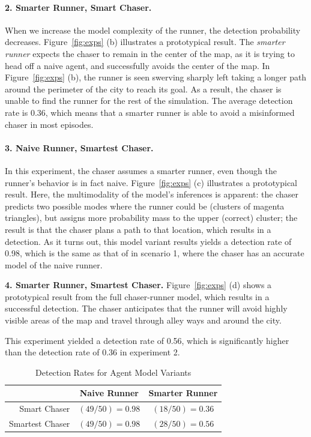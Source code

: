 \documentclass[twoside]{article}
\begin{document}
\paragraph{2. Smarter Runner, Smart Chaser.} When we increase the model complexity of the runner, the detection probability decreases. 
Figure~\ref{fig:exps} (b) illustrates a prototypical result.  The \emph{smarter runner} expects the chaser to remain in the center of the map, as it is trying to head off a naive agent, and successfully avoids the center of the map. In Figure~\ref{fig:exps} (b), the runner is seen swerving sharply left taking a longer path around the perimeter of the city to reach its goal. As a result, the chaser is unable to find the runner for the rest of the simulation. The average detection rate is 0.36, which means that a smarter runner is able to avoid a misinformed chaser in most episodes.

\paragraph{3. Naive Runner, Smartest Chaser.} In this experiment, the chaser assumes a smarter runner, even though the runner's behavior is in fact naive.  Figure~\ref{fig:exps} (c) illustrates a prototypical result. Here, the multimodality of the model's inferences is apparent: the chaser predicts two possible modes where the runner could be (clusters of magenta triangles), but assigns more probability mass to the upper (correct) cluster; the result is that the chaser plans a path to that location, which results in a detection. As it turns out, this model variant results yields a detection rate of 0.98, which is the same as that of in scenario 1, where the chaser has an accurate model of the naive runner.

\textbf{4. Smarter Runner, Smartest Chaser.} Figure~\ref{fig:exps} (d) shows a prototypical result from the full chaser-runner model, which results in a successful detection. The chaser anticipates that the runner will avoid highly visible areas of the map and travel through alley ways and around the city. 

This experiment yielded a detection rate of 0.56, which is significantly higher than the detection rate of 0.36 in experiment 2. %

\begin{table}[!t]
\centering
\begin{tabular}{r|cc}
    \toprule
    & Naive Runner & Smarter Runner \\
    \midrule
    Smart Chaser & $(49/50)=0.98$ & $(18/50)=0.36$ \\
    Smartest Chaser & $(49/50)=0.98$ & $(28/50)=0.56$ \\
    \bottomrule
\end{tabular}
\caption{Detection Rates for Agent Model Variants}
\label{table:detect_rates}
\end{table}
\end{document}
